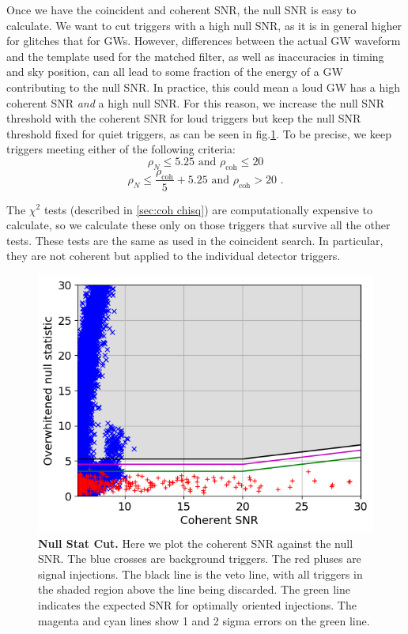 \documentclass[11pt]{cuthesis}
\newcommand{\fs}{\text{ .}}
\begin{document}
Once we have the coincident and coherent SNR, the null SNR is easy to calculate. We want to cut triggers with a high null SNR, as it is in general higher for glitches that for GWs. However, differences between the actual GW waveform and the template used for the matched filter, as well as inaccuracies in timing and sky position, can all lead to some fraction of the energy of a GW contributing to the null SNR. In practice, this could mean a loud GW has a high coherent SNR \textit{and} a high null SNR. For this reason, we increase the null SNR threshold with the coherent SNR for loud triggers but keep the null SNR threshold fixed for quiet triggers, as can be seen in fig.\ref{fig:nullcut}. To be precise, we keep triggers meeting either of the following criteria: 
\begin{equation}
\rho_N\leq5.25 \text{  and   } \rho_\text{coh}\leq 20
\end{equation} 
\begin{equation}
\rho_N \leq \frac{\rho_\text{coh}}{5}+5.25  \text{  and   } \rho_\text{coh}> 20 \fs
\end{equation}

The $\chi^2$ tests (described in \ref{sec:coh chisq}) are computationally expensive to calculate, so we calculate these only on those triggers that survive all the other tests. These tests are the same as used in the coincident search. In particular, they are not coherent but applied to the individual detector triggers. 

\begin{figure} %
\begin{center}
\includegraphics[width=0.8\linewidth]{GRB170817A_null_stat2_vs_snr_zoom.png}
\end{center}
\caption{\textbf{Null Stat Cut.} Here we plot the coherent SNR against the null SNR. The blue crosses are background triggers. The red pluses are signal injections. The black line is the veto line, with all triggers in the shaded region above the line being discarded. The green line indicates the expected SNR for optimally oriented injections. The magenta and cyan lines show 1 and 2 sigma errors on the green line. }
\label{fig:nullcut}
\end{figure}
\end{document}
